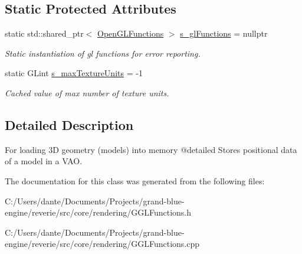 \subsection*{Static Protected Attributes}
\begin{DoxyCompactItemize}
\item 
\mbox{\label{classrev_1_1_g_l_1_1_open_g_l_functions_a9748ed213b45768ca17dc65240967db0}} 
static std\+::shared\+\_\+ptr$<$ \mbox{\hyperlink{classrev_1_1_g_l_1_1_open_g_l_functions}{Open\+G\+L\+Functions}} $>$ \mbox{\hyperlink{classrev_1_1_g_l_1_1_open_g_l_functions_a9748ed213b45768ca17dc65240967db0}{s\+\_\+gl\+Functions}} = nullptr
\begin{DoxyCompactList}\small\item\em Static instantiation of gl functions for error reporting. \end{DoxyCompactList}\item 
\mbox{\label{classrev_1_1_g_l_1_1_open_g_l_functions_ae35ab9b155c6c50befb1503b98b985d2}} 
static G\+Lint \mbox{\hyperlink{classrev_1_1_g_l_1_1_open_g_l_functions_ae35ab9b155c6c50befb1503b98b985d2}{s\+\_\+max\+Texture\+Units}} = -\/1
\begin{DoxyCompactList}\small\item\em Cached value of max number of texture units. \end{DoxyCompactList}\end{DoxyCompactItemize}


\subsection{Detailed Description}
For loading 3D geometry (models) into memory @detailed Stores positional data of a model in a V\+AO. 

The documentation for this class was generated from the following files\+:\begin{DoxyCompactItemize}
\item 
C\+:/\+Users/dante/\+Documents/\+Projects/grand-\/blue-\/engine/reverie/src/core/rendering/G\+G\+L\+Functions.\+h\item 
C\+:/\+Users/dante/\+Documents/\+Projects/grand-\/blue-\/engine/reverie/src/core/rendering/G\+G\+L\+Functions.\+cpp\end{DoxyCompactItemize}
